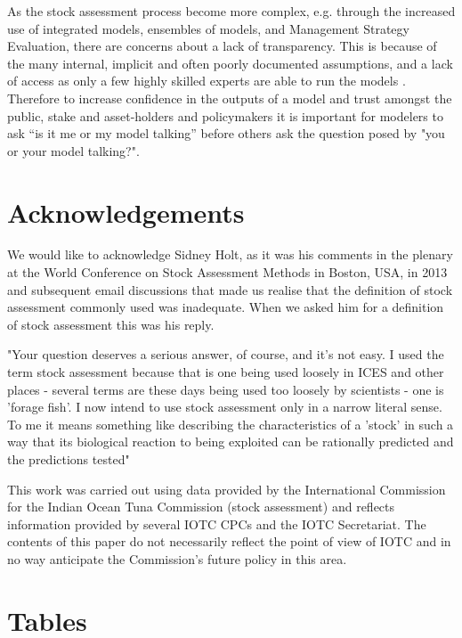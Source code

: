 \documentclass[12pt,halfline,a4paper,nonumbib]{ouparticle}
\begin{document}
As the stock assessment process become more complex, e.g. through the increased use of integrated models, ensembles of models, and Management Strategy Evaluation, there are concerns about a lack of transparency. This is because of the many internal, implicit and often poorly documented assumptions, and a lack of access as only a few highly skilled experts are able to run the models \citep{hilborn2003state}. Therefore to increase confidence in the outputs of a model and trust amongst the public, stake and asset-holders and policymakers it is important for modelers to ask “is it me or my model talking” before others ask the question posed by \cite{hodges1992you} "you or your model talking?".

\section{Acknowledgements}

We would like to acknowledge Sidney Holt, as it was his comments in the plenary at the World Conference on Stock Assessment Methods in Boston, USA, in 2013 and subsequent email discussions that made us realise that the definition of stock assessment commonly used was inadequate. When we asked him for a definition of stock assessment this was his reply.

"Your question deserves a serious answer, of course, and it's not easy. I used the term stock assessment because that is one being used loosely in ICES and other places - several terms are these days being used too loosely by scientists - one is 'forage fish'. I now intend to use stock assessment only in a narrow literal sense. To me it means something like describing the characteristics of a 'stock' in such a way that its biological reaction to being exploited can be rationally predicted and the predictions tested"

This work was carried out using data provided by the International Commission for the Indian  Ocean  Tuna  Commission  (stock assessment)  and  reflects  information  provided  by  several IOTC CPCs and the IOTC Secretariat.  The contents of this paper do not necessarily reflect the point of view of IOTC and in no way anticipate the Commission's future policy in this area.

\clearpage
\newpage
\printbibliography


\clearpage
\newpage
\section{Tables}
\end{document}

